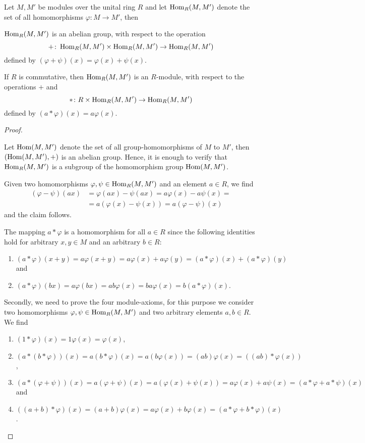 \begin{pro}\label{prop.Homomorphisms are Module}
Let $M,M'$ be modules over the unital ring $R$ and let $\operatorname{\mathrm{Hom}}_R(M,M')$ denote the set of all homomorphisms $\varphi\colon M\to M'$, then
\begin{thmlist}
\item \label{prop.Homomorphisms are Group} $\operatorname{\mathrm{Hom}}_R(M,M')$ is an abelian group, with respect to the operation \[+\colon\operatorname{\mathrm{Hom}}_R(M,M')\times\operatorname{\mathrm{Hom}}_R(M,M')\to\operatorname{\mathrm{Hom}}_R(M,M')\]
defined by $(\varphi+\psi)(x)=\varphi(x)+\psi(x)$.
\item If $R$ is commutative, then $\operatorname{\mathrm{Hom}}_R(M,M')$ is an $R$-module, with respect to the operations $+$ and 
\[\ast\colon R\times\operatorname{\mathrm{Hom}}_R(M,M')\to\operatorname{\mathrm{Hom}}_R(M,M')\]
defined by $(a\ast\varphi)(x)=a\varphi(x)$.
\end{thmlist}
\end{pro}
\begin{proof}
\begin{plist}
\item \sloppypar Let $\operatorname{\mathrm{Hom}}(M,M')$ denote the set of all group-ho\-mo\-morph\-isms of $M$ to $M'$, then $(\operatorname{\mathrm{Hom}}(M,M'),+)$ is an abelian group. Hence, it is enough to verify that $\operatorname{\mathrm{Hom}}_R(M,M')$ is a subgroup of the homomorphism group $\operatorname{\mathrm{Hom}}(M,M')$.

Given two homomorphisms $\varphi,\psi\in\operatorname{\mathrm{Hom}}_R(M,M')$ and an element $a\in R$, we find
\begin{align*}
(\varphi-\psi)(ax)&=\varphi(ax)-\psi(ax)=a\varphi(x)-a\psi(x)=\\
            &=a(\varphi(x)-\psi(x))=a(\varphi-\psi)(x)
\end{align*}
and the claim follows.
\item The mapping $a\ast\varphi$ is a homomorphism for all $a\in R$ since the following identities hold for arbitrary $x,y\in M$ and an arbitrary $b\in R$:
\begin{enumerate}
\item $(a\ast\varphi)(x+y)=a\varphi(x+y)=a\varphi(x)+a\varphi(y)=(a\ast\varphi)(x)+(a\ast\varphi)(y)$ and
\item $(a\ast\varphi)(bx)=a\varphi(bx)=ab\varphi(x)=ba\varphi(x)=b(a\ast\varphi)(x)$.
\end{enumerate} 


Secondly, we need to prove the four module-axioms, for this purpose we consider two homomorphisms $\varphi,\psi\in\operatorname{\mathrm{Hom}}_R(M,M')$ and two arbitrary elements $a,b\in R$. We find
\begin{enumerate}
\item $(1\ast\varphi)(x)=1\varphi(x)=\varphi(x)$,
\item $(a\ast(b\ast\varphi))(x)=a(b\ast\varphi)(x)=a(b\varphi(x))=(ab)\varphi(x)=((ab)\ast\varphi(x))$,
\item $(a\ast(\varphi+\psi))(x)=a(\varphi+\psi)(x)=a(\varphi(x)+\psi(x))=a\varphi(x)+a\psi(x)=(a\ast\varphi + a\ast\psi)(x)$ and
\item $((a+b)\ast\varphi)(x)=(a+b)\varphi(x)=a\varphi(x)+b\varphi(x)=(a\ast\varphi+b\ast\varphi)(x)$.
\end{enumerate}
\end{plist}
\end{proof}

